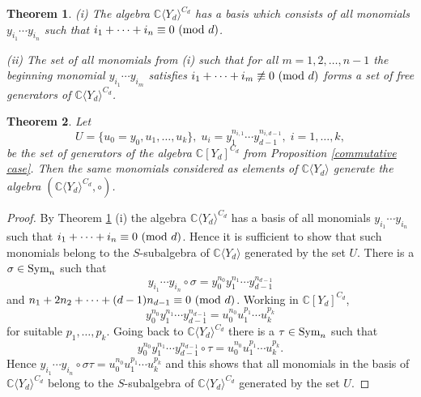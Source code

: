 \documentclass[10pt,a4paper]{amsart}
\newtheorem{theorem}{Theorem}
\begin{document}
\begin{theorem}\label{description of algebra of invariants}
{\rm (i)} The algebra ${\mathbb C}\langle Y_d\rangle^{C_d}$ has a basis which consists of all monomials
$y_{i_1}\cdots y_{i_n}$ such that $i_1+\cdots+i_n\equiv 0\text{ \rm (mod }d)$.

{\rm (ii)} The set of all monomials from {\rm (i)}
such that for all $m=1,2,\ldots,n-1$ the beginning monomial $y_{i_1}\cdots y_{i_m}$ satisfies $i_1+\cdots+i_m\not\equiv 0\text{ \rm (mod }d)$
forms a set of free generators of ${\mathbb C}\langle Y_d\rangle^{C_d}$.
\end{theorem}

\begin{theorem}\label{cyclic S-invariants}
Let
\[
U=\{u_0=y_0,u_1,\ldots,u_k\},\;u_i=y_1^{n_{i,1}}\cdots y_{d-1}^{n_{i,d-1}},\;i=1,\ldots,k,
\]
be the set of generators of the algebra ${\mathbb C}[Y_d]^{C_d}$ from Proposition \ref{commutative case}.
Then the same monomials considered as elements of ${\mathbb C}\langle Y_d\rangle$ generate the algebra
$({\mathbb C}\langle Y_d\rangle^{C_d},\circ)$.
\end{theorem}

\begin{proof}
By Theorem \ref{description of algebra of invariants} (i) the algebra ${\mathbb C}\langle Y_d\rangle^{C_d}$ has a basis of all monomials
$y_{i_1}\cdots y_{i_n}$ such that $i_1+\cdots+i_n\equiv 0\text{ \rm (mod }d)$.
Hence it is sufficient to show that such monomials belong to the $S$-subalgebra of ${\mathbb C}\langle Y_d\rangle$ generated by the set $U$.
There is a $\sigma\in \text{\rm Sym}_n$ such that
\[
y_{i_1}\cdots y_{i_n}\circ\sigma=y_0^{n_0}y_1^{n_1}\cdots y_{d-1}^{n_{d-1}}
\]
and $n_1+2n_2+\cdots+(d-1)n_{d-1}\equiv 0\text{ \rm (mod }d)$. Working in ${\mathbb C}[Y_d]^{C_d}$,
\[
y_0^{n_0}y_1^{n_1}\cdots y_{d-1}^{n_{d-1}}=u_0^{n_0}u_1^{p_1}\cdots u_k^{p_k}
\]
for suitable $p_1,\ldots,p_k$. Going back to ${\mathbb C}\langle Y_d\rangle^{C_d}$ there is a $\tau\in \text{\rm Sym}_n$ such that
\[
y_0^{n_0}y_1^{n_1}\cdots y_{d-1}^{n_{d-1}}\circ\tau=u_0^{n_0}u_1^{p_1}\cdots u_k^{p_k}.
\]
Hence $y_{i_1}\cdots y_{i_n}\circ\sigma\tau=u_0^{n_0}u_1^{p_1}\cdots u_k^{p_k}$ and this shows that all monomials in the basis of
${\mathbb C}\langle Y_d\rangle^{C_d}$ belong to the $S$-subalgebra of ${\mathbb C}\langle Y_d\rangle^{C_d}$ generated by the set $U$.
\end{proof}
\end{document}
